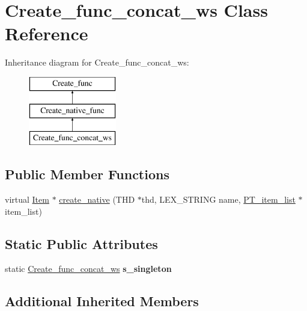\hypertarget{classCreate__func__concat__ws}{}\section{Create\+\_\+func\+\_\+concat\+\_\+ws Class Reference}
\label{classCreate__func__concat__ws}
Inheritance diagram for Create\+\_\+func\+\_\+concat\+\_\+ws\+:\begin{figure}[H]
\begin{center}
\leavevmode
\includegraphics[height=3.000000cm]{classCreate__func__concat__ws}
\end{center}
\end{figure}
\subsection*{Public Member Functions}
\begin{DoxyCompactItemize}
\item 
virtual \mbox{\hyperlink{classItem}{Item}} $\ast$ \mbox{\hyperlink{classCreate__func__concat__ws_a7b67c059213f42b94703ed6a30de6e75}{create\+\_\+native}} (T\+HD $\ast$thd, L\+E\+X\+\_\+\+S\+T\+R\+I\+NG name, \mbox{\hyperlink{classPT__item__list}{P\+T\+\_\+item\+\_\+list}} $\ast$item\+\_\+list)
\end{DoxyCompactItemize}
\subsection*{Static Public Attributes}
\begin{DoxyCompactItemize}
\item 
\mbox{\label{classCreate__func__concat__ws_a5e5150bdeb4dd26dab56151075d5150d}} 
static \mbox{\hyperlink{classCreate__func__concat__ws}{Create\+\_\+func\+\_\+concat\+\_\+ws}} {\bfseries s\+\_\+singleton}
\end{DoxyCompactItemize}
\subsection*{Additional Inherited Members}


